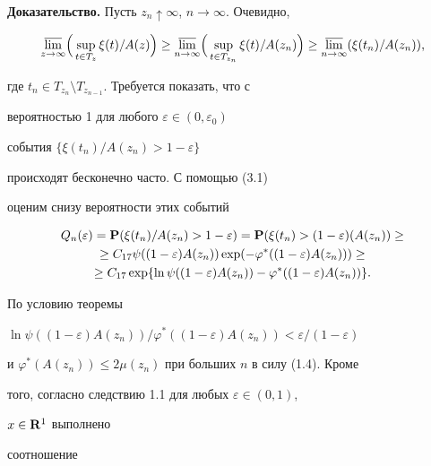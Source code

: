 \medskip


 


{\bf Доказательство.} Пусть $z_n\uparrow\infty$, $n\to\infty$. Очевидно, 


$$ 


\underset{z\to\infty}{\varlimsup}\Bigl(\, 


\sup_{t\in T_z}\xi(t)/A(z)\Bigr)\ge 


\underset{n\to\infty}{\varlimsup}\Bigl(\, 


\sup_{t\in T_{z_n}}\xi(t)/A(z_n)\Bigr)\ge 


\underset{n\to\infty}{\varlimsup}(\xi(t_n)/A(z_n)), 


$$ 


где $t_n\in T_{z_n}\setminus T_{z_{n-1}}$. Требуется показать, что с 


вероятностью 1 для любого $\varepsilon\in(0,\varepsilon_0)$ 


события $\{\xi(t_n)/A(z_n)>1-\varepsilon\}$ 


происходят бесконечно часто. С помощью (3.1) 


оценим снизу вероятности этих событий 


\begin{gather*} 


Q_n(\varepsilon)={\bold P}(\xi(t_n)/A(z_n)>1-\varepsilon)= 


{\bold P}(\xi(t_n)>(1-\varepsilon)(A(z_n))\ge\\ 


\ge C_{17}\psi((1-\varepsilon)A(z_n))\exp(-\varphi^*((1-\varepsilon) 


A(z_n)))\ge\\ 


\ge C_{17}\exp\{\ln\psi((1-\varepsilon)A(z_n))-\varphi^* 


((1-\varepsilon)A(z_n))\}. 


\end{gather*} 


По условию теоремы 


$\ln\psi((1-\varepsilon)A(z_n))/\varphi^*((1-\varepsilon)A(z_n))< 


\varepsilon/(1-\varepsilon)$ 


и $\varphi^*(A(z_n))\le 2\mu(z_n)$ при больших $n$ в силу (1.4). Кроме 


того, согласно следствию 1.1 для любых $\varepsilon\in(0,1)$, 


$x\in{\bold R}^1$ выполнено 


соотношение 


